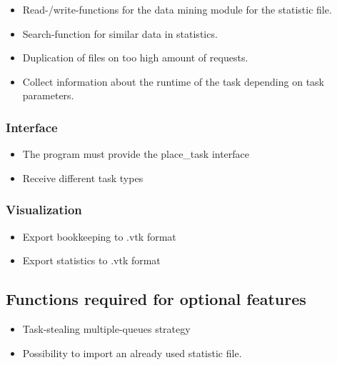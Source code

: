 {\begin{itemize}
				\item Read-/write-functions for the data mining module for the statistic file.
				\item Search-function for similar data in statistics.
				\item Duplication of files on too high amount of requests.
				\item Collect information about the runtime of the task depending on task parameters.
			\end{itemize}
	
	
	\subsubsection{Interface}
	
		\begin{itemize}
			\item The program must provide the place\_task interface
			\item Receive different task types
		\end{itemize}
		
		
	\subsubsection{Visualization}
	
		\begin{itemize}
			\item Export bookkeeping to .vtk format
			\item Export statistics to .vtk format
		\end{itemize}
		
	\subsection{Functions required for optional features}
	
		\begin{itemize}
			\item Task-stealing multiple-queues strategy%
			\item Possibility to import an already used statistic file.%
		\end{itemize}
}
